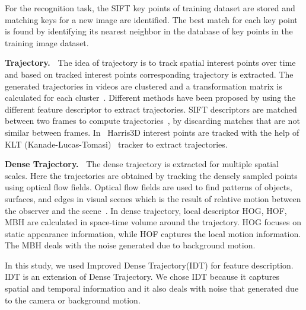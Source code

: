 For the recognition task, the SIFT key points of training dataset are stored and matching keys for a new image are identified. The best match for each key point is found by identifying its nearest neighbor in the database of key points in the training image dataset.%

\noindent
\textbf{Trajectory.~}
The idea of trajectory is to track spatial interest points over time and based on tracked interest points corresponding trajectory is extracted. 
The generated trajectories in videos are clustered and a transformation matrix is calculated for each cluster~\cite{wang2013dense}. Different methods have been proposed by using the different feature descriptor to extract trajectories. SIFT descriptors are matched between two frames to compute trajectories~\cite{sun2010activity}, by discarding matches that are not similar between frames. In~\cite{Laptev2005} Harris3D interest points are tracked with the help of KLT (Kanade-Lucas-Tomasi)~\cite{lucas1981iterative1} tracker to extract trajectories.%

\noindent
\textbf{Dense Trajectory.~}
The dense trajectory is extracted for multiple spatial scales. Here the trajectories are obtained by tracking the densely sampled points using optical flow fields. Optical flow fields are used to find patterns of objects, surfaces, and edges in visual scenes which is the result of relative motion between the observer and the scene~\cite{6233178}. In dense trajectory, local descriptor HOG, HOF, MBH are calculated in space-time volume around the trajectory. HOG focuses on static appearance information, while HOF captures the local motion information. The MBH deals with the noise generated due to background motion.

In this study, we used Improved Dense Trajectory(IDT) for feature description. IDT is an extension of Dense Trajectory. We chose IDT because it captures spatial and temporal information and it also deals with noise that generated due to the camera or background motion.



